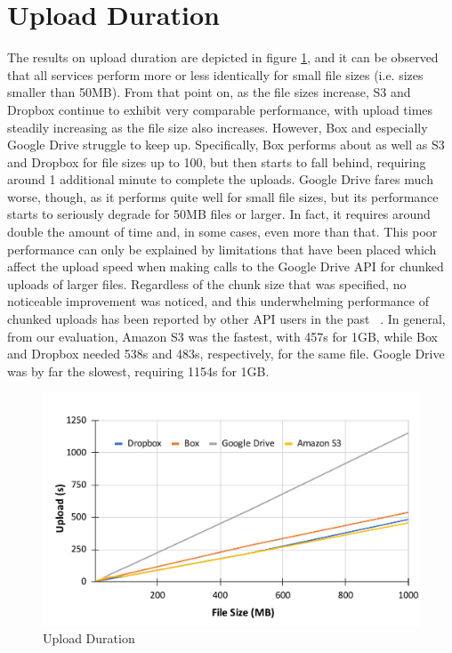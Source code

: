 \section{Upload Duration}
The results on upload duration are depicted in figure \ref{fig:upload_duration}, and it can be observed that all services perform more or less identically for small file sizes (i.e. sizes smaller than 50MB). From that point on,  as the file sizes increase, S3 and Dropbox continue to exhibit very comparable performance, with upload times steadily increasing as the file size also increases.  However, Box and especially Google Drive struggle to keep up. Specifically, Box performs about as well as S3 and Dropbox for file sizes up to 100, but then starts to fall behind, requiring around 1 additional minute to complete the uploads. Google Drive fares much worse, though, as it performs quite well for small file sizes, but its performance starts to seriously degrade for 50MB files or larger. In fact, it requires around double the amount of time and, in some cases, even more than that. This poor performance can only be explained by limitations that have been placed which affect the  upload speed when making calls to the Google Drive API for chunked uploads of larger files. Regardless of the chunk size that was specified, no noticeable improvement was noticed, and this underwhelming performance of chunked uploads has been reported by other API users in the past ~\cite{drive_chunked_performance}. In general, from our evaluation, Amazon S3 was the fastest, with 457s for 1GB, while Box and Dropbox needed 538s and 483s, respectively, for the same file. Google Drive was by far the slowest, requiring 1154s for 1GB.

\begin{figure} [!h]
	\centering
	\includegraphics[scale=0.5]{images/upload_chart}
	\caption{\label{fig:upload_duration}Upload Duration}
\end{figure}

